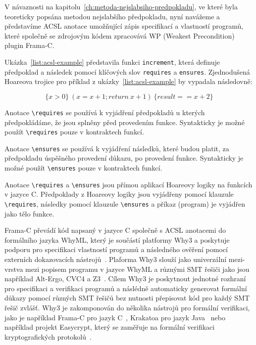 V návaznosti na kapitolu~\ref{ch:metoda-nejslabsiho-predpokladu},
ve které byla teoreticky popsána metodou nejslabšího předpokladu,
nyní navážeme a představíme ACSL anotace umožňující zápis specifikací a vlastností programů,
které společně se zdrojovým kódem zpracovává WP (Weakest Precondition) plugin Frama\mbox{-}C\@.

Ukázka~\ref{list:acsl-example} představila funkci \texttt{increment},
která definuje předpoklad a následek pomocí klíčových slov \texttt{requires} a \texttt{ensures}.
Zjednodušená Hoareova trojice pro příklad z ukázky~\ref{list:acsl-example} by vypadala následovně:

\begin{equation*}
    \{ x > 0 \} \ (x = x + 1; return \  x + 1) \ \{ result == x + 2 \}
\end{equation*}

Anotace \texttt{\textbackslash requires} se používá k vyjádření předpokladů
u kterých předpokládáme, že jsou splněny před provedením funkce.
Syntakticky je možné použít \texttt{\textbackslash requires} pouze v kontraktech funkcí.

Anotace \texttt{\textbackslash ensures} se používá k vyjádření následků,
které budou platit, za předpokladu úspěšného provedení důkazu, po provedení funkce.
Syntakticky je možné použít \texttt{\textbackslash ensures} pouze v kontraktech funkcí.

Anotace \texttt{\textbackslash requires} a \texttt{\textbackslash ensures}
jsou přímou aplikací Hoareovy logiky na funkcích v jazyce C\@.
Předpoklady z Hoareovy logiky jsou vyjádřeny pomocí klauzule \texttt{\textbackslash requires},
následky pomocí klauzule \texttt{\textbackslash ensures} a příkaz (program) je vyjádřen jako tělo funkce.

Frama\mbox{-}C převádí kód napsaný v jazyce C společně s ACSL anotacemi do formálního jazyka WhyML,
který je součástí platformy Why3 a poskytuje podporu pro specifikaci vlastností programů
a následného ověření pomocí externích dokazovacích nástrojů~\cite{why3web}.
Plaforma Why3 slouží jako univerzální mezi-vrstva mezi popisem programu v jazyce WhyML a různými SMT řešiči
jako jsou například Alt-Ergo, CVC4 a Z3~\cite{boogie11why3}.
Cílem Why3 je poskytnout jednotné rozhraní pro specifikaci a verifikaci programů
a náslédně automaticky generovat formální důkazy pomocí různých SMT řešičů bez nutnosti přepisovat kód pro každý SMT řešič zvlášť.
Why3 je zakomponován do několika nástrojů pro formální verifikaci,
jako je například Frama\mbox{-}C pro jazyk C~\cite{BlanchardACSL2024},
Krakatoa pro jazyk Java~\cite{KrakatoaWhy} nebo například projekt Easycrypt,
který se zaměřuje na formální verifikaci kryptografických protokolů~\cite{why3web}.

